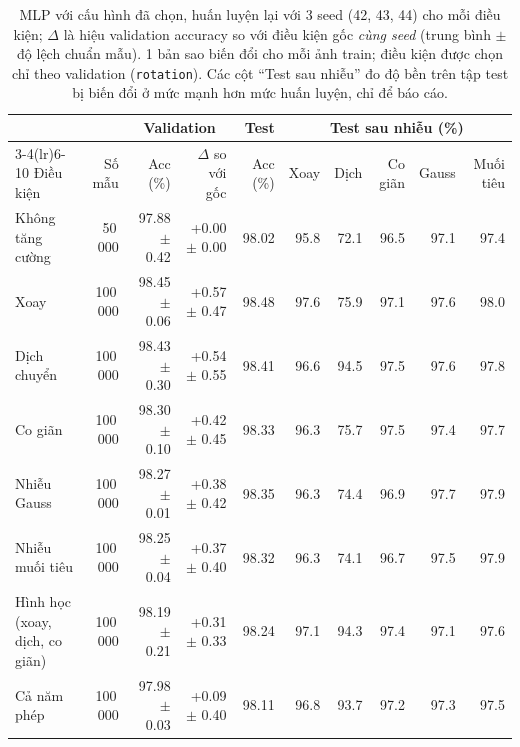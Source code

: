\begin{table}[H]\centering\scriptsize
\setlength{\tabcolsep}{3pt}
\begin{tabular}{lrrrrrrrrr}
\toprule
 & & \multicolumn{2}{c}{Validation} & Test & \multicolumn{5}{c}{Test sau nhiễu (\%)} \\
\cmidrule(lr){3-4}\cmidrule(lr){6-10}
Điều kiện & Số mẫu & Acc (\%) & $\Delta$ so với gốc & Acc (\%) & Xoay & Dịch & Co giãn & Gauss & Muối tiêu \\
\midrule
Không tăng cường & 50\,000 & 97.88 $\pm$ 0.42 & +0.00 $\pm$ 0.00 & 98.02 & 95.8 & 72.1 & 96.5 & 97.1 & 97.4 \\
Xoay & 100\,000 & 98.45 $\pm$ 0.06 & +0.57 $\pm$ 0.47 & 98.48 & 97.6 & 75.9 & 97.1 & 97.6 & 98.0 \\
Dịch chuyển & 100\,000 & 98.43 $\pm$ 0.30 & +0.54 $\pm$ 0.55 & 98.41 & 96.6 & 94.5 & 97.5 & 97.6 & 97.8 \\
Co giãn & 100\,000 & 98.30 $\pm$ 0.10 & +0.42 $\pm$ 0.45 & 98.33 & 96.3 & 75.7 & 97.5 & 97.4 & 97.7 \\
Nhiễu Gauss & 100\,000 & 98.27 $\pm$ 0.01 & +0.38 $\pm$ 0.42 & 98.35 & 96.3 & 74.4 & 96.9 & 97.7 & 97.9 \\
Nhiễu muối tiêu & 100\,000 & 98.25 $\pm$ 0.04 & +0.37 $\pm$ 0.40 & 98.32 & 96.3 & 74.1 & 96.7 & 97.5 & 97.9 \\
Hình học (xoay, dịch, co giãn) & 100\,000 & 98.19 $\pm$ 0.21 & +0.31 $\pm$ 0.33 & 98.24 & 97.1 & 94.3 & 97.4 & 97.1 & 97.6 \\
Cả năm phép & 100\,000 & 97.98 $\pm$ 0.03 & +0.09 $\pm$ 0.40 & 98.11 & 96.8 & 93.7 & 97.2 & 97.3 & 97.5 \\
\bottomrule
\end{tabular}
\caption{MLP với cấu hình đã chọn, huấn luyện lại với 3 seed (42, 43, 44) cho mỗi điều kiện; $\Delta$ là hiệu validation accuracy so với điều kiện gốc \emph{cùng seed} (trung bình $\pm$ độ lệch chuẩn mẫu). 1 bản sao biến đổi cho mỗi ảnh train; điều kiện được chọn chỉ theo validation (\texttt{rotation}). Các cột ``Test sau nhiễu'' đo độ bền trên tập test bị biến đổi ở mức mạnh hơn mức huấn luyện, chỉ để báo cáo.}
\label{tab:augmentation-mlp}
\end{table}
